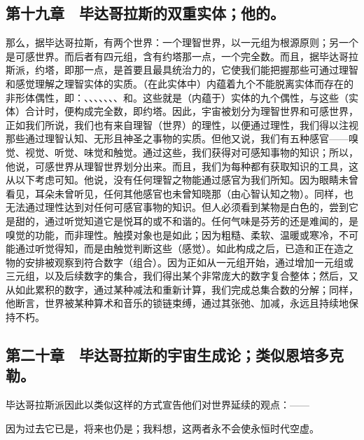 
\subsection{第十九章　毕达哥拉斯的双重实体；他的。}

那么，据毕达哥拉斯，有两个世界：一个理智世界，以一元组为根源原则；另一个是可感世界。而后者有四元组，含有约塔那一点，一个完全数。而且，据毕达哥拉斯派，约塔，即那一点，是首要且最具统治力的，它使我们能把握那些可通过理智和感觉理解之理智实体的实质。（在此实体中）内蕴着九个不能脱离实体而存在的非形体偶性，即：、、、、、、、和。这些就是（内蕴于）实体的九个偶性，与这些（实体）合计时，便构成完全数，即约塔。因此，宇宙被划分为理智世界和可感世界，正如我们所说，我们也有来自理智（世界）的理性，以便通过理性，我们得以注视那些通过理智认知、无形且神圣之事物的实质。但他又说，我们有五种感官——嗅觉、视觉、听觉、味觉和触觉。通过这些，我们获得对可感知事物的知识；所以，他说，可感世界从理智世界划分出来。而且，我们为每种都有获取知识的工具，这从以下考虑可知。他说，没有任何理智之物能通过感官为我们所知。因为眼睛未曾看见，耳朵未曾听见，任何其他感官也未曾知晓那（由心智认知之物）。同样，也无法通过理性达到对任何可感官事物的知识。但人必须看到某物是白色的，尝到它是甜的，通过听觉知道它是悦耳的或不和谐的。任何气味是芬芳的还是难闻的，是嗅觉的功能，而非理性。触摸对象也是如此；因为粗糙、柔软、温暖或寒冷，不可能通过听觉得知，而是由触觉判断这些（感觉）。如此构成之后，已造和正在造之物的安排被观察到符合数字（组合）。因为正如从一元组开始，通过增加一元组或三元组，以及后续数字的集合，我们得出某个非常庞大的数字复合整体；然后，又从如此累积的数字，通过某种减法和重新计算，我们完成总集合数的分解；同样，他断言，世界被某种算术和音乐的锁链束缚，通过其张弛、加减，永远且持续地保持不朽。\par


\subsection{第二十章　毕达哥拉斯的宇宙生成论；类似恩培多克勒。}

毕达哥拉斯派因此以类似这样的方式宣告他们对世界延续的观点：——\par

因为过去它已是，将来也仍是；我料想，\newline{}这两者永不会使永恒时代空虚。\par

